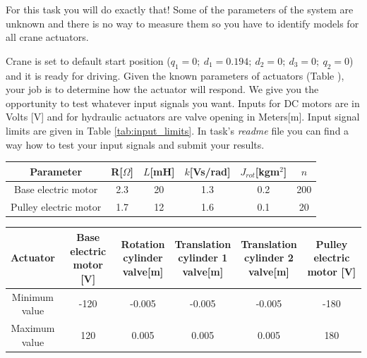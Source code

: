 \documentclass{article}
\begin{document}
	For this task you will do exactly that! Some of the parameters of the system are unknown and there is no way to measure them so you have to identify models for all crane actuators.
	
	Crane is set to default start position ($q_1 = 0; \ d_1 = 0.194; \  d_2 = 0; \  d_3 = 0; \  q_2 = 0$) and it is ready for driving. Given the known parameters of actuators (Table ), your job is to determine how the actuator will respond. We give you the opportunity to test whatever input signals you want.
	Inputs for DC motors are in Volts [V] and for hydraulic actuators are valve opening in Meters[m]. Input signal limits are given in Table \ref{tab:input_limits}.  In task's \textit{readme} file you can find a way how to test your input signals and submit your results.
	
	\begin{center}
		\label{tab:inverse}
		\label{tab:el_params}
		\begin{tabular}{|| c || c c c c c||}
			\hline
			Parameter & R[$\Omega$] & $L$[mH] & $k$[Vs/rad] & $J_{rot}$[kgm$^2$] & 
			$n$\\
			\hline\hline
			Base electric motor & 2.3 & 20 & 1.3 & 0.2 & 200\\ 
			\hline
			Pulley electric motor & 1.7 & 12 & 1.6 & 0.1 & 20\\
			\hline
		\end{tabular}
	\end{center}
	
	\begin{center}
		
		\label{tab:input_limits}
		\begin{tabular}{|| c || c c c c c ||}
			\hline
			Actuator & \makecell{Base electric \\ motor [V]} & \makecell{Rotation \\ cylinder \\ valve[m]} & \makecell{Translation \\ cylinder 1 \\ valve[m]} & \makecell{Translation \\ cylinder 2 \\ valve[m]} &  \makecell{Pulley electric \\ motor [V]}\\
			\hline\hline
			\makecell{Minimum \\ value} & -120 & -0.005 & -0.005 & -0.005 & -180 \\ 
			\hline
			\makecell{Maximum\\ value} & 120 & 0.005 & 0.005 & 0.005 & 180 \\ 
			\hline
		\end{tabular}
	\end{center}
	
\end{document}
